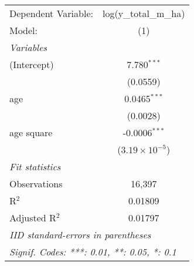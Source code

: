 
\begingroup
\centering
\begin{tabular}{lc}
   \tabularnewline \midrule \midrule
   Dependent Variable: & log(y\_total\_m\_ha)\\     
   Model:              & (1)\\  
   \midrule
   \emph{Variables}\\
   (Intercept)         & 7.780$^{***}$\\   
                       & (0.0559)\\   
   age                 & 0.0465$^{***}$\\   
                       & (0.0028)\\   
   age square          & -0.0006$^{***}$\\   
                       & ($3.19\times 10^{-5}$)\\    
   \midrule
   \emph{Fit statistics}\\
   Observations        & 16,397\\  
   R$^2$               & 0.01809\\  
   Adjusted R$^2$      & 0.01797\\  
   \midrule \midrule
   \multicolumn{2}{l}{\emph{IID standard-errors in parentheses}}\\
   \multicolumn{2}{l}{\emph{Signif. Codes: ***: 0.01, **: 0.05, *: 0.1}}\\
\end{tabular}
\par\endgroup


